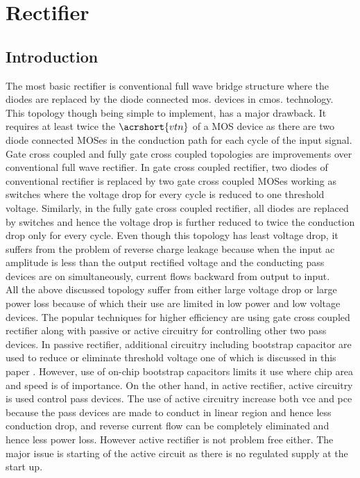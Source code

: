 \documentclass[UKenglish]{ifimaster}  %
\begin{document}
\chapter{Rectifier}  

\section{Introduction}	 	%

The most basic rectifier is conventional full wave bridge structure where the diodes are replaced by the diode connected \acrshort{mos}. devices in \acrshort{cmos}. technology. This topology though being simple to implement, has a major drawback. It requires at least twice the $\acrshort{vtn}$ of a MOS device as there are two diode connected MOSes in the conduction path for each cycle of the input signal.  \\

Gate cross coupled and fully gate cross coupled topologies are improvements over conventional full wave rectifier. In gate cross coupled rectifier, two diodes of conventional rectifier is replaced by two gate cross coupled MOSes working as switches where the voltage drop for every cycle is reduced to one threshold voltage. Similarly, in the fully gate cross coupled rectifier, all diodes are replaced by switches and hence the voltage drop is further reduced to twice the conduction drop only for every cycle. Even though this topology has least voltage drop, it suffers from the problem of reverse charge leakage because when the input ac amplitude is less than the output rectified voltage and the conducting pass devices are on simultaneously, current flows backward from output to input. \\

All the above discussed topology suffer from either large voltage drop or large power loss because of which their use are limited in low power and low voltage devices. The popular techniques for higher efficiency are using gate cross coupled rectifier along with passive or active circuitry  for controlling other two pass devices. In passive rectifier, additional circuitry including bootstrap capacitor are used to reduce or eliminate threshold voltage one of which is discussed in this paper \cite{rectboot}. However, use of on-chip bootstrap capacitors limits it use where chip area and speed is of importance. On the other hand, in active rectifier, active circuitry is used control pass devices. The use of active circuitry increase both  \gls{vce} and  \gls{pce} because the pass devices are made to conduct in linear region and hence less conduction drop, and reverse current flow can be completely eliminated and hence less power loss. However active rectifier is not problem free either. The major issue is starting of the active circuit as there is no regulated supply at the start up. \\
\end{document}
